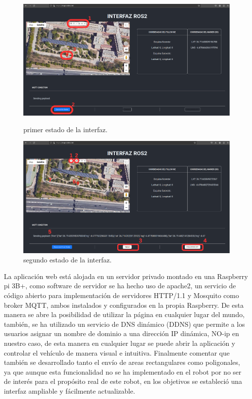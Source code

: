 \begin{figure}[htbp]
  \centering
  \begin{minipage}[b]{0.8\textwidth}
    \centering
    \includegraphics[width=\textwidth]{images/interfaz_1.png}
    \caption{primer estado de la interfaz.}
    \label{fig:interfaz_1}
  \end{minipage}
  \hfill
  \begin{minipage}[b]{0.8\textwidth}
    \centering
    \includegraphics[width=\textwidth]{images/interfaz_2.png}
    \caption{segundo estado de la interfaz.}
    \label{fig:interfaz_2}
  \end{minipage}
\end{figure}

La aplicación web está alojada en un servidor privado montado en una Raspberry pi 3B+, como software de servidor se ha hecho uso de apache2, 
un servicio de código abierto para implementación de servidores HTTP/1.1 y Mosquito como broker MQTT, ambos instalados y configurados en la propia 
Raspberry. De esta manera se abre la posibilidad de utilizar la página en cualquier lugar del mundo, también, se ha utilizado un servicio de DNS dinámico (DDNS) 
que permite a los usuarios asignar un nombre de dominio a una dirección IP dinámica, NO-ip en nuestro caso, de esta manera en cualquier 
lugar se puede abrir la aplicación y controlar el vehículo de manera visual e intuitiva. Finalmente
comentar que también se desarrollado tanto el envío de areas rectangulares como poligonales, ya que aunque esta 
funcionalidad no se ha implementado en el robot por no ser de interés para el propósito real de este robot, en los objetivos se estableció 
una interfaz ampliable y fácilmente actualizable.



